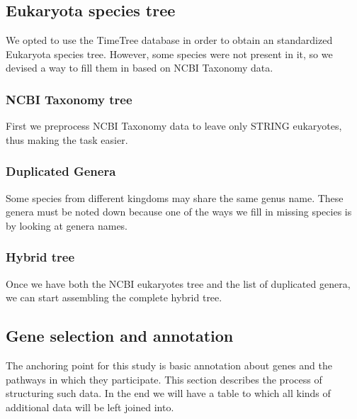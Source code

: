 \documentclass[
]{article}
\begin{document}
\hypertarget{eukaryota-species-tree}{%
\subsection{Eukaryota species tree}\label{eukaryota-species-tree}}

We opted to use the TimeTree database in order to obtain an standardized
Eukaryota species tree. However, some species were not present in it, so
we devised a way to fill them in based on NCBI Taxonomy data.

\hypertarget{ncbi-taxonomy-tree}{%
\subsubsection{NCBI Taxonomy tree}\label{ncbi-taxonomy-tree}}

First we preprocess NCBI Taxonomy data to leave only STRING eukaryotes,
thus making the task easier. 

\hypertarget{duplicated-genera}{%
\subsubsection{Duplicated Genera}\label{duplicated-genera}}

Some species from different kingdoms may share the same genus name.
These genera must be noted down because one of the ways we fill in
missing species is by looking at genera names.


\hypertarget{hybrid-tree}{%
\subsubsection{Hybrid tree}\label{hybrid-tree}}

Once we have both the NCBI eukaryotes tree and the list of duplicated
genera, we can start assembling the complete hybrid tree.


\hypertarget{gene-selection-and-annotation}{%
\subsection{Gene selection and
annotation}\label{gene-selection-and-annotation}}

The anchoring point for this study is basic annotation about genes and
the pathways in which they participate. This section describes the
process of structuring such data. In the end we will have a table to
which all kinds of additional data will be left joined into.

\end{document}
